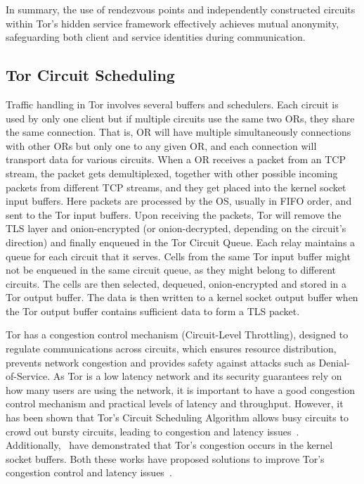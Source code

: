 In summary, the use of rendezvous points and independently constructed circuits within Tor's hidden service framework effectively achieves mutual anonymity, safeguarding both client and service identities during communication.

\subsection{Tor Circuit Scheduling}\label{subsec:tor_scheduler}

Traffic handling in Tor involves several buffers and schedulers.
Each circuit is used by only one client but if multiple circuits use the same two ORs, they share the same connection. That is, OR will have multiple simultaneously connections with other ORs but only one to any given OR, and each connection will transport data for various circuits. 
When a OR receives a packet from an TCP stream, the packet gets demultiplexed, together with other possible incoming packets from different TCP streams, and they get placed into the kernel socket input buffers. Here packets are processed by the OS, usually in FIFO order, and sent to the Tor input buffers. Upon receiving the packets, Tor will remove the TLS layer and onion-encrypted (or onion-decrypted, depending on the circuit's direction) and finally enqueued in the Tor Circuit Queue. Each relay maintains a queue for each circuit that it serves. Cells from the same Tor input buffer might not be enqueued in the same circuit queue, as they might belong to different circuits. The cells are then selected, dequeued, onion-encrypted and stored in a Tor output buffer. The data is then written to a kernel socket output buffer when the Tor output buffer contains sufficient data to form a TLS packet.

Tor has a congestion control mechanism (Circuit-Level Throttling), designed to regulate communications across circuits, which ensures resource distribution, prevents network congestion and provides safety against attacks such as Denial-of-Service. As Tor is a low latency network and its security guarantees rely on how many users are using the network, it is important to have a good congestion control mechanism and practical levels of latency and throughput. However, it has been shown that Tor's Circuit Scheduling Algorithm allows busy circuits to crowd out bursty circuits, leading to congestion and latency issues~\cite{EWMA}. Additionally,~\citeauthor{KIST} have demonstrated that Tor's congestion occurs in the kernel socket buffers. Both these works have proposed solutions to improve Tor's congestion control and latency issues~\cite{KIST}.

